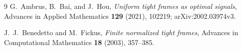\documentclass[11pt]{article}
\begin{document}
\begin{thebibliography}{9}
G.~Ambrus, B.~Bai, and J.~Hou,
\emph{Uniform tight frames as optimal signals},
Advances in Applied Mathematics \textbf{129} (2021), 102219;
arXiv:2002.03974v3.

J.~J.~Benedetto and M.~Fickus,
\emph{Finite normalized tight frames},
Advances in Computational Mathematics \textbf{18} (2003), 357--385.
\end{thebibliography}
\end{document}
